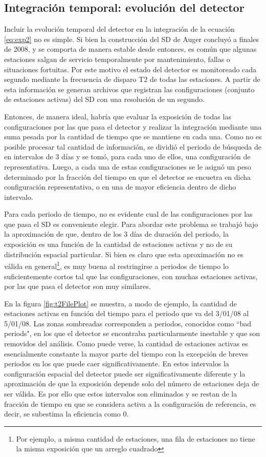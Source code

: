 	\subsection{Integración temporal: evolución del detector}
	
	Incluir la evolución temporal del detector en la integración de la ecuación \ref{eq:exp2} no es simple.
	Si bien la construcción del SD de Auger concluyó a finales de 2008, y se comporta de manera estable desde entonces, es común que algunas estaciones salgan de servicio temporalmente por mantenimiento, fallas o situaciones fortuitas.
	Por este motivo el estado del detector es monitoreado cada segundo mediante la frecuencia de disparo T2 de todas las estaciones.
	A partir de esta información se generan archivos que registran las configuraciones (conjunto de estaciones activas) del SD con una resolución de un segundo.
	
	Entonces, de manera ideal, habría que evaluar la exposición de todas las configuraciones por las que pasa el detector y realizar la integración mediante una suma pesada por la cantidad de tiempo que se mantiene en cada una.
	Como no es posible procesar tal cantidad de información, se dividió el periodo de búsqueda de en intervalos de 3 días y se tomó, para cada uno de ellos, una configuración de representativa. 
	Luego, a cada una de estas configuraciones se le asignó un peso determinado por la fracción del tiempo en que el detector se encuetra en dicha configuración representativa, o en una de mayor eficiencia dentro de dicho intervalo.
	
	Para cada periodo de tiempo, no es evidente cual de las configuraciones por las que pasa el SD es conveniente elegir.
	Para abordar este problema se trabajó bajo la aproximación de que, dentro de los 3 días de duración del periodo, la exposición es una función de la cantidad de estaciones activas y no de su distribución espacial particular.
	Si bien es claro que esta aproximación no es válida en general\footnote{Por ejemplo, a misma cantidad de estaciones, una fila de estaciones no tiene la misma exposición que un arreglo cuadrado}, es muy buena al restringirse a periodos de tiempo lo suficientemente cortos tal que las configuraciones, con muchas estaciones activas, por las que pasa el detector son muy similares.
	
	En la figura \ref{fig:t2FilePlot} se muestra, a modo de ejemplo, la cantidad de estaciones activas en función del tiempo para el periodo que va del 3/01/08 al 5/01/08. Las zonas sombreadas corresponden a periodos, conocidos como ``bad periods", en los que el detector se encontraba particularmente inestable y que son removidos del análisis.
	Como puede verse, la cantidad de estaciones activas es esencialmente constante la mayor parte del tiempo con la excepción de breves periodos en los que puede caer significativamente.
	En estos intervalos la configuración espacial del detector puede ser significativamente diferente y la aproximación de que la exposición depende solo del número de estaciones deja de ser válida.
	Es por ello que estos intervalos son eliminados y se restan de la fracción de tiempo en que se considera activa a la configuración de referencia, es decir, se subestima la eficiencia como 0.
	
